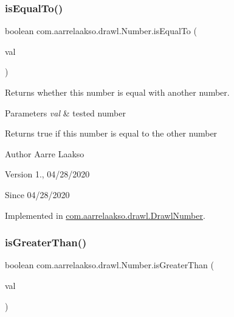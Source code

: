 \subsubsection{\texorpdfstring{is\+Equal\+To()}{isEqualTo()}}
{\footnotesize\ttfamily boolean com.\+aarrelaakso.\+drawl.\+Number.\+is\+Equal\+To (\begin{DoxyParamCaption}\item[{@Not\+Null final \hyperlink{interfacecom_1_1aarrelaakso_1_1drawl_1_1_number}{Number}}]{val }\end{DoxyParamCaption})}



Returns whether this number is equal with another number. 


\begin{DoxyParams}{Parameters}
{\em val} & tested number \\
\hline
\end{DoxyParams}
\begin{DoxyReturn}{Returns}
true if this number is equal to the other number 
\end{DoxyReturn}
\begin{DoxyAuthor}{Author}
Aarre Laakso 
\end{DoxyAuthor}
\begin{DoxyVersion}{Version}
1., 04/28/2020 
\end{DoxyVersion}
\begin{DoxySince}{Since}
04/28/2020 
\end{DoxySince}


Implemented in \hyperlink{classcom_1_1aarrelaakso_1_1drawl_1_1_drawl_number_af9c62a136858a5eae279039658a2cfdc}{com.\+aarrelaakso.\+drawl.\+Drawl\+Number}.

\mbox{\label{interfacecom_1_1aarrelaakso_1_1drawl_1_1_number_a487be710eb911b7f3395014ee8cd4155}} 
\subsubsection{\texorpdfstring{is\+Greater\+Than()}{isGreaterThan()}\hspace{0.1cm}{\footnotesize\ttfamily [1/2]}}
{\footnotesize\ttfamily boolean com.\+aarrelaakso.\+drawl.\+Number.\+is\+Greater\+Than (\begin{DoxyParamCaption}\item[{@Not\+Null final \hyperlink{interfacecom_1_1aarrelaakso_1_1drawl_1_1_number}{Number}}]{val }\end{DoxyParamCaption})}



